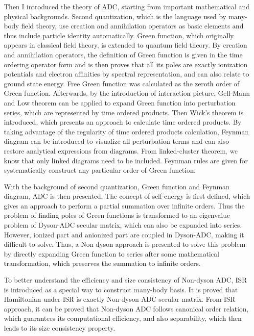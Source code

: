 \documentclass[bachelor, english]{ustcthesis}
\begin{document}
Then I introduced the theory of ADC, starting from important mathematical and physical backgrounds.
Second quantization, which is the language used by many-body field theory, use creation and annihilation operators as basic elements and thus include particle identity automatically.
Green function, which originally appears in classical field theory, is extended to quantum field theory.
By creation and annihilation operators, the definition of Green function is given in the time ordering operator form and is then proves that all its poles are exactly ionization potentials and electron affinities by spectral representation, and can also relate to ground state energy.
Free Green function was calculated as the zeroth order of Green function.
Afterwards, by the introduction of interaction picture, Gell-Mann and Low theorem can be applied to expand Green function into perturbation series, which are represented by time ordered products.
Then Wick's theorem is introduced, which presents an approach to calculate time ordered products.
By taking advantage of the regularity of time ordered products calculation, Feynman diagram can be introduced to visualize all perturbation terms and can also restore analytical expressions from diagrams.
From linked-cluster theorem, we know that only linked diagrams need to be included.
Feynman rules are given for systematically construct any particular order of Green function.

With the background of second quantization, Green function and Feynman diagram, ADC is then presented.
The concept of self-energy is first defined, which gives an approach to perform a partial summation over infinite orders.
Thus the problem of finding poles of Green functions is transformed to an eigenvalue problem of Dyson-ADC secular matrix, which can also be expanded into series.
However, ionized part and anionized part are coupled in Dyson-ADC, making it difficult to solve.
Thus, a Non-dyson approach is presented to solve this problem by directly expanding Green function to series after some mathematical transformation, which preserves the summation to infinite orders.

To better understand the efficiency and size consistency of Non-dyson ADC, ISR is introduced as a special way to construct many-body basis.
It is proved that Hamiltonian under ISR is exactly Non-dyson ADC secular matrix.
From ISR approach, it can be proved that Non-dyson ADC follows canonical order relation, which guarantees its computational efficiency, and also separability, which then leads to its size consistency property.
\end{document}
